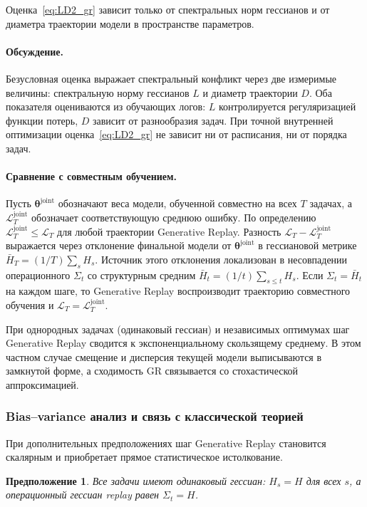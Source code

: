 \documentclass[a4paper,14pt,oneside,openany]{extarticle}
\newtheorem{assumption}{Предположение}
\newcommand{\cL}{\mathcal{L}}
\newcommand{\btheta}{\boldsymbol{\theta}}
\begin{document}
Оценка~\eqref{eq:LD2_gr} зависит только от спектральных норм гессианов и от диаметра траектории модели в пространстве параметров.

\paragraph{Обсуждение.}
Безусловная оценка выражает спектральный конфликт через две измеримые величины: спектральную норму гессианов $L$ и диаметр траектории $D$. Оба показателя оцениваются из обучающих логов: $L$ контролируется регуляризацией функции потерь, $D$ зависит от разнообразия задач. При точной внутренней оптимизации оценка~\eqref{eq:LD2_gr} не зависит ни от расписания, ни от порядка задач. 

\paragraph{Сравнение с совместным обучением.}
Пусть $\btheta^{\text{joint}}$ обозначают веса модели, обученной совместно на всех $T$ задачах, а $\cL^{\text{joint}}_T$ обозначает соответствующую среднюю ошибку. По определению $\cL^{\text{joint}}_T \le \cL_T$ для любой траектории Generative Replay. Разность $\cL_T - \cL^{\text{joint}}_T$ выражается через отклонение финальной модели от $\btheta^{\text{joint}}$ в гессиановой метрике $\bar H_T = (1/T)\sum_s H_s$. Источник этого отклонения локализован в несовпадении операционного $\Sigma_t$ со структурным средним $\bar H_t = (1/t)\sum_{s \le t} H_s$. Если $\Sigma_t = \bar H_t$ на каждом шаге, то Generative Replay воспроизводит траекторию совместного обучения и $\cL_T = \cL^{\text{joint}}_T$.

При однородных задачах (одинаковый гессиан) и независимых оптимумах шаг Generative Replay сводится к экспоненциальному скользящему среднему. В этом частном случае смещение и дисперсия текущей модели выписываются в замкнутой форме, а сходимость GR связывается со стохастической аппроксимацией.

\subsubsection{Bias--variance анализ и связь с классической теорией}

При дополнительных предположениях шаг Generative Replay становится скалярным и приобретает прямое статистическое истолкование.

\begin{assumption}\label{ass:common_H_gr}
    Все задачи имеют одинаковый гессиан: $H_s = H$ для всех $s$, а операционный гессиан replay равен $\Sigma_t = H$.
\end{assumption}
\end{document}
